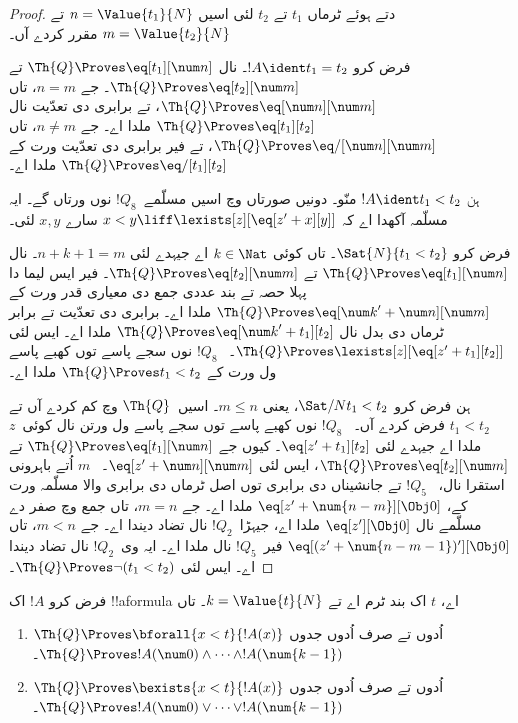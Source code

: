 \documentclass[../../../include/open-logic-section]{subfiles}
\begin{document}
\begin{proof}
دتے ہوئے ٹرماں $t_1$ تے $t_2$ لئی اسیں $n = \Value{t_1}{N}$
تے $m = \Value{t_2}{N}$ مقرر کردے آں۔

فرض کرو $!A \ident t_1 = t_2$۔ 
نال $\Th{Q} \Proves \eq[t_1][\num n]$ تے $\Th{Q} \Proves \eq[t_2][\num m]$۔
جے $n = m$، تاں $\Th{Q} \Proves \eq[\num n][\num m]$، تے برابری
دی تعدّیت نال $\Th{Q} \Proves \eq[t_1][t_2]$ ملدا اے۔
جے $n \neq m$، تاں $\Th{Q} \Proves \eq/[\num n][\num m]$، تے
فیر برابری دی تعدّیت ورت کے $\Th{Q} \Proves \eq/[t_1][t_2]$ ملدا اے۔

ہن $!A \ident t_1 < t_2$ منّو۔ دونیں صورتاں وچ اسیں
مسلّمے~$!Q_8$ نوں ورتاں گے۔ ایہ مسلّمہ آکھدا اے کہ
$x < y \liff \lexists[z][\eq[z' + x][y]]$ سارے $x,y$ لئی۔

فرض کرو $\Sat{N}{t_1 < t_2}$۔ تاں کوئی $k \in \Nat$ اے
جیہدے لئی $n + k + 1 = m$۔  نال
$\Th{Q} \Proves \eq[t_1][\num n]$ تے $\Th{Q} \Proves \eq[t_2][\num m]$۔
فیر ایس لیما دا پہلا حصہ تے بند عددی جمع دی معیاری قدر ورت کے
$\Th{Q} \Proves \eq[{\num k}' + \num n][\num m]$ ملدا اے۔
برابری دی تعدّیت تے برابر ٹرماں دی بدل نال
$\Th{Q} \Proves \eq[{\num k}' + t_1][t_2]$ ملدا اے۔
ایس لئی $\Th{Q} \Proves \lexists[z][\eq[z' + t_1][t_2]]$۔
~$!Q_8$ نوں سجے پاسے توں کھبے پاسے ول ورت کے
$\Th{Q} \Proves t_1 < t_2$ ملدا اے۔

ہن فرض کرو $\Sat/{N}{t_1 < t_2}$، یعنی $m \leq n$۔
%
اسیں~$\Th{Q}$ وچ کم کردے آں تے $t_1 < t_2$ فرض کردے آں۔
~$!Q_8$ نوں کھبے پاسے توں سجے پاسے ول ورتن نال کوئی~$z$
ملدا اے جیہدے لئی $\eq[z' + t_1][t_2]$۔
کیوں جے $\Th{Q} \Proves \eq[t_1][\num n]$ تے
$\Th{Q} \Proves \eq[t_2][\num m]$، ایس لئی $\eq[z' + \num n][\num m]$۔
%
~$m$ اُتے باہرونی استقرا نال، ~$!Q_5$ تے جانشیناں دی برابری
توں اصل ٹرماں دی برابری والا مسلّمہ ورت کے،
$\eq[z' + \num{n - m}][\Obj 0]$ ملدا اے۔
جے $m = n$، تاں جمع وچ صفر دے مسلّمے نال $\eq[z'][\Obj 0]$
ملدا اے، جیہڑا~$!Q_2$ نال تضاد دیندا اے۔
جے $m < n$، تاں $\eq[(z' + \num{n - m - 1})'][\Obj 0]$
فیر~$!Q_5$ نال ملدا اے۔ ایہ وی~$!Q_2$ نال تضاد دیندا اے۔
ایس لئی $\Th{Q} \Proves \lnot(t_1 < t_2)$۔
\end{proof}

\begin{lem}
فرض کرو $!A$ اک !!a{formula} اے، $t$ اک بند ٹرم اے تے
$k=\Value{t}{N}$۔ تاں
\begin{enumerate}
\item $\Th{Q} \Proves \bforall{x<t}{!A(x)}$ اُدوں تے صرف اُدوں جدوں $\Th{Q} \Proves
    !A(\num 0) \land \dots \land !A(\num{k-1})$۔
\item $\Th{Q} \Proves \bexists{x<t}{!A(x)}$ اُدوں تے صرف اُدوں جدوں $\Th{Q} \Proves
    !A(\num 0) \lor \dots \lor !A(\num{k-1})$۔
\end{enumerate}
\end{lem}
\end{document}
